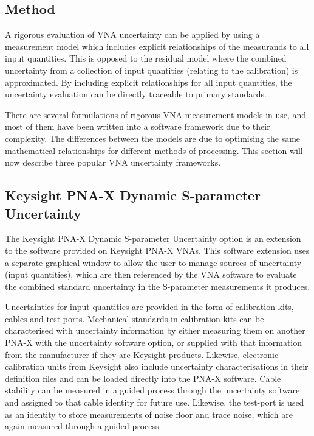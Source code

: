 \documentclass[../thesis/thesis.tex]{subfiles}
\begin{document}
\subsection{Method}

A rigorous evaluation of VNA uncertainty can be applied by using a measurement model which includes explicit relationships of the measurands to all input quantities. This is opposed to the residual model where the combined uncertainty from a collection of input quantities (relating to the calibration) is approximated. By including explicit relationships for all input quantities, the uncertainty evaluation can be directly traceable to primary standards.

There are several formulations of rigorous VNA measurement models in use, and most of them have been written into a software framework due to their complexity. The differences between the models are due to optimising the same mathematical relationships for different methods of processing. This section will now describe three popular VNA uncertainty frameworks.

\subsection{Keysight PNA-X Dynamic S-parameter Uncertainty}

The Keysight PNA-X Dynamic S-parameter Uncertainty option is an extension to the software provided on Keysight PNA-X VNAs. This software extension uses a separate graphical window to allow the user to manage sources of uncertainty (input quantities), which are then referenced by the VNA software to evaluate the combined standard uncertainty in the S-parameter measurements it produces.

Uncertainties for input quantities are provided in the form of calibration kits, cables and test ports. Mechanical standards in calibration kits can be characterised with uncertainty information by either measuring them on another PNA-X with the uncertainty software option, or supplied with that information from the manufacturer if they are Keysight products. Likewise, electronic calibration units from Keysight also include uncertainty characterisations in their definition files and can be loaded directly into the PNA-X software. Cable stability can be measured in a guided process through the uncertainty software and assigned to that cable identity for future use. Likewise, the test-port is used as an identity to store measurements of noise floor and trace noise, which are again measured through a guided process.
\end{document}
